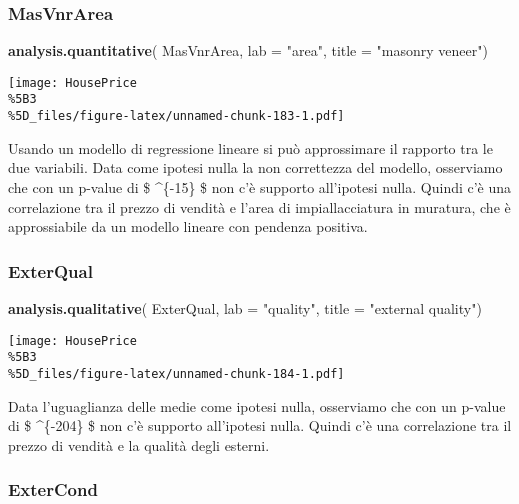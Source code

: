 \documentclass[
]{article}
\newenvironment{Shaded}{\begin{snugshade}}{\end{snugshade}}
\newcommand{\AttributeTok}[1]{\textcolor[rgb]{0.13,0.29,0.53}{#1}}
\newcommand{\FunctionTok}[1]{\textcolor[rgb]{0.13,0.29,0.53}{\textbf{#1}}}
\newcommand{\NormalTok}[1]{#1}
\newcommand{\StringTok}[1]{\textcolor[rgb]{0.31,0.60,0.02}{#1}}
\begin{document}
\subsubsection{MasVnrArea}\label{masvnrarea-1}

\begin{Shaded}
\begin{Highlighting}[]
\FunctionTok{analysis.quantitative}\NormalTok{(}
\NormalTok{    MasVnrArea,}
    \AttributeTok{lab =} \StringTok{"area"}\NormalTok{,}
    \AttributeTok{title =} \StringTok{"masonry veneer"}\NormalTok{)}
\end{Highlighting}
\end{Shaded}

\texttt{[image: HousePrice\\\%5B3\\\%5D\_files/figure-latex/unnamed-chunk-183-1.pdf]}

Usando un modello di regressione lineare si può approssimare il rapporto
tra le due variabili. Data come ipotesi nulla la non correttezza del
modello, osserviamo che con un p-value di \$ \^{}\{-15\} \$
non c'è supporto all'ipotesi nulla. Quindi c'è una correlazione tra il
prezzo di vendità e l'area di impiallacciatura in muratura, che è
approssiabile da un modello lineare con pendenza positiva.

\subsubsection{ExterQual}\label{exterqual-1}

\begin{Shaded}
\begin{Highlighting}[]
\FunctionTok{analysis.qualitative}\NormalTok{(}
\NormalTok{    ExterQual,}
    \AttributeTok{lab =} \StringTok{"quality"}\NormalTok{,}
    \AttributeTok{title =} \StringTok{"external quality"}\NormalTok{)}
\end{Highlighting}
\end{Shaded}

\texttt{[image: HousePrice\\\%5B3\\\%5D\_files/figure-latex/unnamed-chunk-184-1.pdf]}

Data l'uguaglianza delle medie come ipotesi nulla, osserviamo che con un
p-value di \$ \^{}\{-204\} \$ non c'è supporto all'ipotesi
nulla. Quindi c'è una correlazione tra il prezzo di vendità e la qualità
degli esterni.

\subsubsection{ExterCond}\label{extercond-1}
\end{document}

